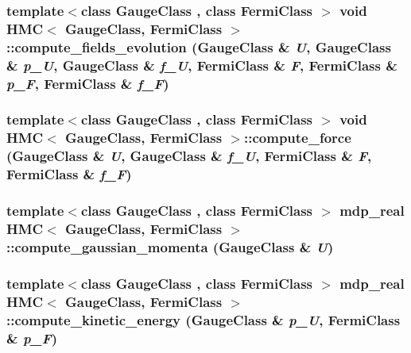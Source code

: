 \label{class_h_m_c_a2e84b43878a9162a4370c6272f7db6ac}
\hypertarget{class_h_m_c_aa91216c67c4304558aa47b9011abb9d2}{
\subsubsection[{compute\_\-fields\_\-evolution}]{\setlength{\rightskip}{0pt plus 5cm}template$<$class GaugeClass , class FermiClass $>$ void {\bf HMC}$<$ GaugeClass, FermiClass $>$::compute\_\-fields\_\-evolution (GaugeClass \& {\em U}, \/  GaugeClass \& {\em p\_\-U}, \/  GaugeClass \& {\em f\_\-U}, \/  FermiClass \& {\em F}, \/  FermiClass \& {\em p\_\-F}, \/  FermiClass \& {\em f\_\-F})}}
\label{class_h_m_c_aa91216c67c4304558aa47b9011abb9d2}
\hypertarget{class_h_m_c_a055e331f19f692a381f098e02f939e79}{
\subsubsection[{compute\_\-force}]{\setlength{\rightskip}{0pt plus 5cm}template$<$class GaugeClass , class FermiClass $>$ void {\bf HMC}$<$ GaugeClass, FermiClass $>$::compute\_\-force (GaugeClass \& {\em U}, \/  GaugeClass \& {\em f\_\-U}, \/  FermiClass \& {\em F}, \/  FermiClass \& {\em f\_\-F})}}
\label{class_h_m_c_a055e331f19f692a381f098e02f939e79}
\hypertarget{class_h_m_c_aaf6eb48e4a79b5c65b7fd80e9f34f072}{
\subsubsection[{compute\_\-gaussian\_\-momenta}]{\setlength{\rightskip}{0pt plus 5cm}template$<$class GaugeClass , class FermiClass $>$ {\bf mdp\_\-real} {\bf HMC}$<$ GaugeClass, FermiClass $>$::compute\_\-gaussian\_\-momenta (GaugeClass \& {\em U})}}
\label{class_h_m_c_aaf6eb48e4a79b5c65b7fd80e9f34f072}
\hypertarget{class_h_m_c_a278a4514882a4b585797364c6c7c1ba2}{
\subsubsection[{compute\_\-kinetic\_\-energy}]{\setlength{\rightskip}{0pt plus 5cm}template$<$class GaugeClass , class FermiClass $>$ {\bf mdp\_\-real} {\bf HMC}$<$ GaugeClass, FermiClass $>$::compute\_\-kinetic\_\-energy (GaugeClass \& {\em p\_\-U}, \/  FermiClass \& {\em p\_\-F})}}
